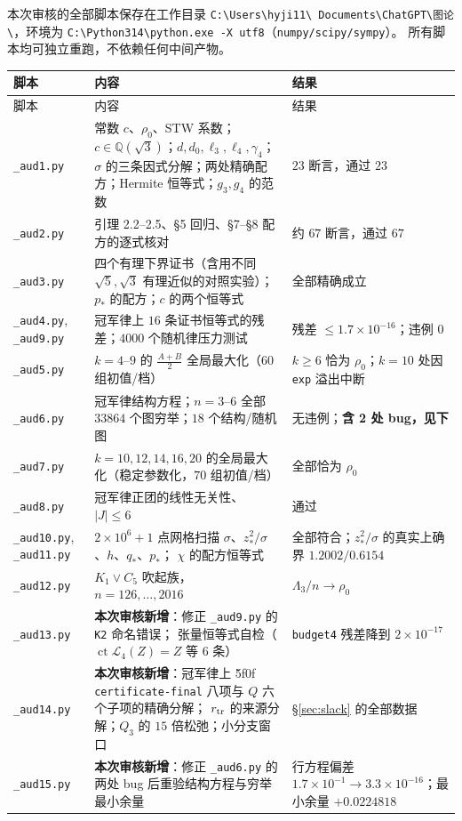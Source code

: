 \documentclass[UTF8,11pt]{ctexart}
\theoremstyle{definition}
\newcommand{\peq}[1]{\textup{\u5f0f}\,\texttt{#1}}
\begin{document}
本次审核的全部脚本保存在工作目录 \texttt{C:\textbackslash Users\textbackslash hyji11\textbackslash
Documents\textbackslash ChatGPT\textbackslash 图论\textbackslash}，环境为
\texttt{C:\textbackslash Python314\textbackslash python.exe -X utf8}（\texttt{numpy/scipy/sympy}）。
所有脚本均可独立重跑，不依赖任何中间产物。

\begingroup\small
\begin{longtable}{@{}p{}p{}p{}@{}}
\toprule
脚本 & 内容 & 结果\\
\midrule
\endfirsthead
\toprule
脚本 & 内容 & 结果\\
\midrule
\endhead
\texttt{\_aud1.py} & 常数 $c$、$\rho_0$、STW 系数；$c\in\mathbb Q(\sqrt3)$；$d,d_0,\ell_3,\ell_4,\gamma_4$；
$\sigma$ 的三条因式分解；两处精确配方；Hermite 恒等式；$g_3,g_4$ 的范数 & $23$ 断言，通过 $23$\\
\texttt{\_aud2.py} & 引理 2.2--2.5、\S5 回归、\S7--\S8 配方的逐式核对 & 约 $67$ 断言，通过 $67$\\
\texttt{\_aud3.py} & 四个有理下界证书（含用不同 $\sqrt5,\sqrt3$ 有理近似的对照实验）；
$p_*$ 的配方；$c$ 的两个恒等式 & 全部精确成立\\
\texttt{\_aud4.py}, \texttt{\_aud9.py} & 冠军律上 $16$ 条证书恒等式的残差；$4000$ 个随机律压力测试 &
残差 $\le1.7\times10^{-16}$；违例 $0$\\
\texttt{\_aud5.py} & $k=4$--$9$ 的 $\frac{A+B}2$ 全局最大化（$60$ 组初值/档） &
$k\ge6$ 恰为 $\rho_0$；$k=10$ 处因 \texttt{exp} 溢出中断\\
\texttt{\_aud6.py} & 冠军律结构方程；$n=3$--$6$ 全部 $33864$ 个图穷举；$18$ 个结构/随机图 &
无违例；\textbf{含 2 处 bug，见下}\\
\texttt{\_aud7.py} & $k=10,12,14,16,20$ 的全局最大化（稳定参数化，$70$ 组初值/档） &
全部恰为 $\rho_0$\\
\texttt{\_aud8.py} & 冠军律正团的线性无关性、$|J|\le6$ & 通过\\
\texttt{\_aud10.py}, \texttt{\_aud11.py} & $2\times10^6+1$ 点网格扫描 $\sigma$、$z_*^2/\sigma$、$h$、$q_*$、$p_*$；
$\chi$ 的配方恒等式 & 全部符合；$z_*^2/\sigma$ 的真实上确界 $1.2002/0.6154$\\
\texttt{\_aud12.py} & $K_1\vee C_5$ 吹起族，$n=126,\ldots,2016$ & $\Lambda_3/n\to\rho_0$\\
\texttt{\_aud13.py} & \textbf{本次审核新增}：修正 \texttt{\_aud9.py} 的 \texttt{K2} 命名错误；
张量恒等式自检（$\operatorname{ct}\mathcal L_4(Z)=Z$ 等 $6$ 条） & \texttt{budget4} 残差降到 $2\times10^{-17}$\\
\texttt{\_aud14.py} & \textbf{本次审核新增}：冠军律上 \peq{certificate-final} 八项与 $Q$ 六个子项的精确分解；
$r_{\rm tr}$ 的来源分解；$Q_3$ 的 $15$ 倍松弛；小分支窗口 & \S\ref{sec:slack} 的全部数据\\
\texttt{\_aud15.py} & \textbf{本次审核新增}：修正 \texttt{\_aud6.py} 的两处 bug 后重验结构方程与穷举最小余量 &
行方程偏差 $1.7\times10^{-1}\to3.3\times10^{-16}$；最小余量 $+0.0224818$\\
\bottomrule
\end{longtable}
\endgroup
\end{document}
